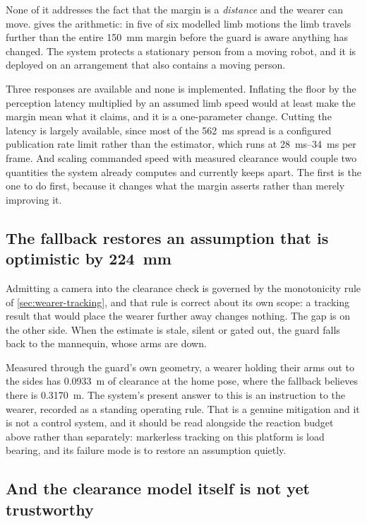 None of it addresses the fact that the margin is a \emph{distance} and the
wearer can move.  gives the arithmetic: in five of six
modelled limb motions the limb travels further than the entire
\SI{150}{\milli\metre} margin before the guard is aware anything has changed.
The system protects a stationary person from a moving robot, and it is
deployed on an arrangement that also contains a moving person.

Three responses are available and none is implemented. Inflating the floor by
the perception latency multiplied by an assumed limb speed would at least make
the margin mean what it claims, and it is a one-parameter change. Cutting the
latency is largely available, since most of the \SI{562}{\milli\second}
spread is a configured publication rate limit rather than the estimator, which
runs at \SIrange{28}{34}{\milli\second} per frame. And scaling commanded speed
with measured clearance would couple two quantities the system already
computes and currently keeps apart. The first is the one to do first, because
it changes what the margin asserts rather than merely improving it.

\subsection{The fallback restores an assumption that is optimistic by
\SI{224}{\milli\metre}}

Admitting a camera into the clearance check is governed by the monotonicity
rule of \cref{sec:wearer-tracking}, and that rule is correct about its own
scope: a tracking result that would place the wearer further away changes
nothing. The gap is on the other side. When the estimate is stale, silent or
gated out, the guard falls back to the mannequin, whose arms are down.

Measured through the guard's own geometry, a wearer holding their arms out to
the sides has \SI{0.0933}{\metre} of clearance at the home pose, where the
fallback believes there is \SI{0.3170}{\metre}. The system's present answer to
this is an instruction to the wearer, recorded as a standing operating rule.
That is a genuine mitigation and it is not a control system, and it should be
read alongside the reaction budget above rather than separately: markerless
tracking on this platform is load bearing, and its failure mode is to restore
an assumption quietly.

\subsection{And the clearance model itself is not yet trustworthy}

